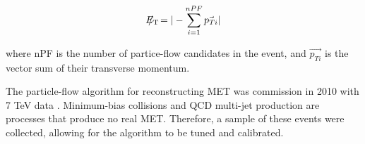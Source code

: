 \begin{equation}\label{eq:met}
E_{\mathrm{T}}\hspace{-1.1em}/\kern0.45em = | - \sum_{i=1}^{nPF} \vec{p_{Ti}} |
\end{equation}

\noindent where nPF is the number of partice-flow candidates in the
event, and $\vec{p_{Ti}}$ is the vector sum of their transverse
momentum.  

\par The particle-flow algorithm for reconstructing MET was commission
in 2010 with 7 TeV data \cite{CMS-PAS-PFT-10-002}.  Minimum-bias
collisions and QCD multi-jet production are processes that produce no
real MET.  Therefore, a sample of these events were collected,
allowing for the algorithm to be tuned and calibrated.  
